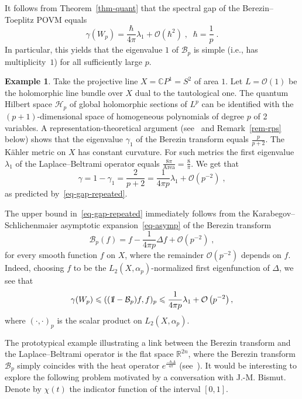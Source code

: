 \documentclass[11pt]{article}
\theoremstyle{definition}
\newtheorem{exam}[theo]{Example}
\numberwithin{equation}{section}
\numberwithin{figure}{section}
\numberwithin{table}{section}
\newcommand{\R}{{\mathbb{R}}}
\newcommand{\CCC}{{\mathbb{C}}}
\newcommand{\cB}{{\mathcal{B}}}
\newcommand*\id{{1\hskip-2.5pt{\rm l}}}
\newcommand{\bigo}{\mathcal{O}}
\newcommand{\Hilb}{\mathcal{H}}
\renewcommand\leq {\leqslant}
\newcommand\< {\mathcal{h}}
\renewcommand\> {\mathcal{i}}
\begin{document}
It follows from Theorem~\ref{thm-quant} that the spectral gap of the Berezin--Toeplitz POVM equals
\begin{equation}\label{eq-gap-repeated}
\gamma(W_p)= \frac{\hbar}{4\pi}\lambda_1 + \bigo\left(\hbar^2\right)\;, \;\; \hbar = \frac{1}{p}\;.
\end{equation}
In particular, this yields that the eigenvalue $1$ of $\cB_p$ is simple (i.e., has multiplicity~$1$) for all sufficiently large $p$.

\begin{exam}\label{exam-CP1}
Take the projective line $X=\CCC P^1=S^2$ of area $1$.
Let $L= \bigo(1)$ be the holomorphic line bundle over $X$ dual to the tautological one. The quantum Hilbert space $\Hilb_p$ of global holomorphic sections of $L^p$ can be identified with the $(p+1)$-dimensional space of homogeneous polynomials of degree $p$ of 2 variables. A representation-theoretical argument (see~\cite {gap-representations, D} and Remark~\ref{rem-rps} below) shows that the eigenvalue $\gamma_1$ of the Berezin transform equals $\frac{p}{p+2}$. The K\"ahler metric on $X$ has constant curvature. For such metrics the first eigenvalue $\lambda_1$ of the Laplace--Beltrami operator equals $\frac{8\pi}{\text{Area}} = \frac{8}{\pi}$. We get that
\[
\gamma = 1-\gamma_1 = \frac{2}{p+2} = \frac{1}{4\pi p}\lambda_1 + \bigo\left(p^{-2}\right)\;,
\]
as predicted by~\eqref{eq-gap-repeated}.
\end{exam}

The upper bound in~\eqref{eq-gap-repeated} immediately follows from the Karabegov--Schlichen\-maier asymptotic expansion~\eqref{eq-asymp} of the Berezin transform~\cite{KS01}
\[
\cB_p(f)= f- \frac{1}{4\pi p}\Delta f + \bigo\left(p^{-2} \right)\;,
\]
for every smooth function $f$ on $X$, where the remainder $\bigo(p^{-2})$ depends on $f$. Indeed, choosing $f$ to be the $L_2(X,\alpha_p)$-normalized first eigenfunction of $\Delta$, we see that
\[
\gamma(W_p) \leq ((\id-\cB_p)f,f)_p \leq \frac{1}{4\pi p}\lambda_1 + \bigo\left(p^{-2}\right),
\]
where $(\cdot,\cdot)_p$ is the scalar product on $L_2(X,\alpha_p)$.

The prototypical example illustrating a link between the Berezin transform and the Laplace--Beltrami operator is the flat space $\R^{2n}$, where the Berezin transform $\cB_p$ simply coincides with the heat operator $e^{\frac{-\hbar \Delta}{4\pi}}$ (see~\cite{B}). It would be interesting to explore the following problem motivated by a conversation with J.-M. Bismut. Denote by $\chi(t)$ the indicator function of the interval $[0,1]$.
%
\end{document}
